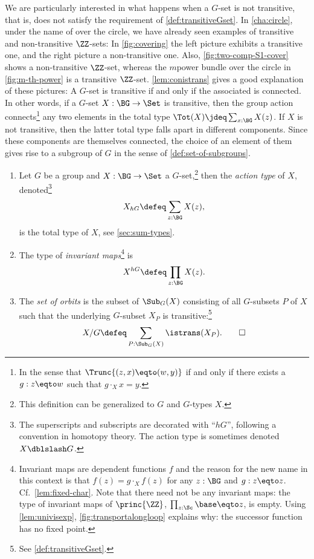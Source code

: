 We are particularly interested in what happens when a $G$-set
is not transitive, that is, does not satisfy the requirement of 
\cref{def:transitiveGset}. In \cref{cha:circle}, under the name
of \coverings over the circle, we have already seen examples of
transitive and non-transitive $\ZZ$-sets:
In \cref{fig:covering} the left picture exhibits a transitive one,
and the right picture  a non-transitive one. Also, 
\cref{fig:two-comp-S1-cover} shows a non-transitive $\ZZ$-set,
whereas the $m$\th power bundle over the circle in
\cref{fig:m-th-power} is a transitive $\ZZ$-set.
\cref{lem:conistrans} gives a good explanation of these pictures:
A $G$-set is transitive if and only if the associated \covering is connected.
In other words, if a $G$-set $X:\BG\to\Set$ is transitive, then the
group action connects\footnote{In the sense that $\Trunc{(z,x)\eqto(w,y)}$
if and only if there exists a $g:z\eqto w$ such that $g\cdot_X x = y$.} 
any two elements in the total type $\Tot(X) \jdeq \sum_{x:\BG} X(z)$.
If $X$ is not transitive, then the latter total type falls apart 
in different components. Since these components are themselves
connected, the choice of an element of them gives rise to a subgroup of $G$
in the sense of \cref{def:set-of-subgroups}.

\begin{definition}\label{def:actiontype} 
  \begin{enumerate}
  \item Let $G$ be a group and $X : \BG\to\Set$ a $G$-set,\footnote{%
      This definition can be generalized to \inftygps $G$ and $G$-types $X$.}
    then the \emph{action type}
    of $X$, denoted\footnote{%
      The superscripts and subscripts are decorated with ``$hG$'',
      following a convention in homotopy theory.
      The action type is sometimes denoted $X \dblslash G$.}
    \[
      X_{hG} \defeq \sum_{z:\BG} X(z),
    \]
    is the total type of $X$, see \cref{sec:sum-types}.
   
  \item The type of \emph{invariant maps}\footnote{%
      Invariant maps are dependent functions $f$ and the reason for the new name in
      this context is that $f(z) = g \cdot_X f(z)$ for any $z:\BG$ and $g:z\eqto
      z$. Cf.~\cref{lem:fixed-char}. Note that there need not be any invariant maps:
      the type of invariant maps of $\princ{\ZZ}$, \ie $\prod_{z:\Sc}\base\eqto z$,
      is empty.  Using \cref{lem:univisexp}, \cref{fig:transportalongloop} explains
      why: the successor function has no fixed point.%
    }  is
    \[
      X^{hG} \defeq \prod_{z:\BG} X(z).
    \]

  \item The \emph{set of orbits} is the
    subset of $\Sub_G(X)$ consisting of all $G$-subsets $P$ of $X$ such that the
    underlying $G$-subset $X_P$ is transitive:\footnote{See
      \cref{def:transitiveGset}.}
    \[
      X / G \defeq \sum_{P:\Sub_G(X)}\istrans(X_P).\qedhere
    \]
  \end{enumerate}
\end{definition}

